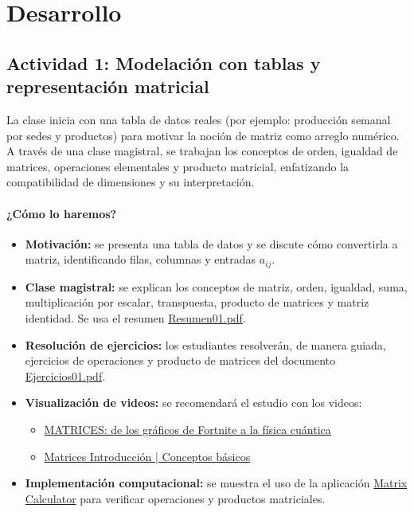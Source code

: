 \documentclass[a4,11pt]{aleph-notas}
\begin{document}
\section*{Desarrollo}  

\subsection*{Actividad 1: Modelación con tablas y representación matricial}

La clase inicia con una tabla de datos reales (por ejemplo: producción semanal por sedes y productos) para motivar la noción de matriz como arreglo numérico. A través de una clase magistral, se trabajan los conceptos de orden, igualdad de matrices, operaciones elementales y producto matricial, enfatizando la compatibilidad de dimensiones y su interpretación.

\paragraph{¿Cómo lo haremos?}  
\begin{itemize}[leftmargin=*]  
    \item \textbf{Motivación:} se presenta una tabla de datos y se discute cómo convertirla a matriz, identificando filas, columnas y entradas $a_{ij}$.
    \item \textbf{Clase magistral:} se explican los conceptos de matriz, orden, igualdad, suma, multiplicación por escalar, transpuesta, producto de matrices y matriz identidad. Se usa el resumen \href{https://fcena-puce.github.io/AlgLinealyGeomAnalitica-05-N0068/2-Resumenes/Resumen01.pdf}{Resumen01.pdf}.  
    \item \textbf{Resolución de ejercicios:} los estudiantes resolverán, de manera guiada, ejercicios de operaciones y producto de matrices del documento \href{https://fcena-puce.github.io/AlgLinealyGeomAnalitica-05-N0068/2-Ejercicios/Ejercicios01.pdf}{Ejercicios01.pdf}.  
    \item \textbf{Visualización de videos:} se recomendará el estudio con los videos:  
    \begin{itemize}
        \item \href{https://youtu.be/9FKFgNQktkU?si=kGRbP9Ad-NRRciwL}{MATRICES: de los gráficos de Fortnite a la física cuántica}
        \item \href{https://youtu.be/m6w5vLA3Lnw?si=xcCeg-0snioQb-ns}{Matrices Introducción | Conceptos básicos}
    \end{itemize}  
    \item \textbf{Implementación computacional:} se muestra el uso de la aplicación \href{https://matrixcalc.org/es/}{Matrix Calculator} para verificar operaciones y productos matriciales.
\end{itemize}  
\end{document}
